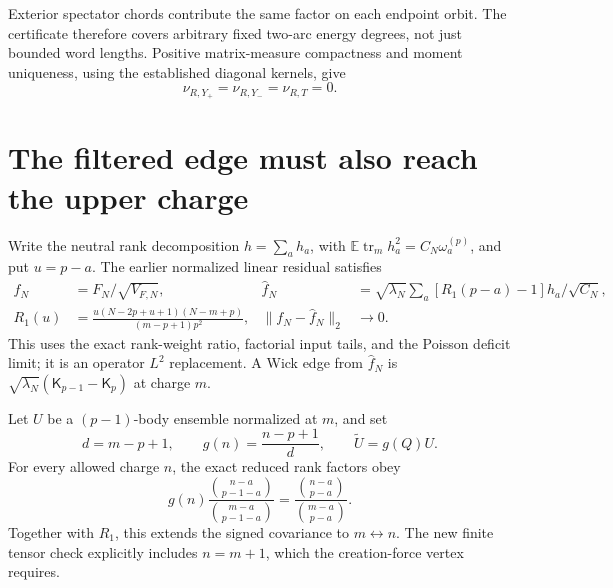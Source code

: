 \documentclass[11pt,a4paper]{article}
\newcommand{\EE}{\mathbb E}
\newcommand{\tr}{\operatorname{tr}}
\begin{document}
Exterior spectator chords contribute the same factor on each
endpoint orbit. The certificate therefore covers arbitrary fixed
two-arc energy degrees, not just bounded word lengths. Positive
matrix-measure compactness and moment uniqueness, using the
established diagonal kernels, give
\begin{equation}
 \boxed{\ \nu_{R,Y_+}=\nu_{R,Y_-}=\nu_{R,T}=0.\ } \label{Rcross}
\end{equation}

\newpage
\section{The filtered edge must also reach the upper charge}
Write the neutral rank decomposition $h=\sum_a h_a$, with
$\EE\tr_m h_a^2=C_N\omega_a^{(p)}$, and put $u=p-a$.
The earlier normalized linear residual satisfies
\begin{align}
 f_N&=F_N/\sqrt{V_{F,N}},&
 \widehat f_N&=\sqrt{\lambda_N}\sum_a[R_1(p-a)-1]h_a/\sqrt{C_N},\\
 R_1(u)&=\frac{u(N-2p+u+1)(N-m+p)}{(m-p+1)p^2},&
 \|f_N-\widehat f_N\|_2&\longrightarrow0. \label{fbridge}
\end{align}
This uses the exact rank-weight ratio, factorial input tails, and
the Poisson deficit limit; it is an operator $L^2$ replacement.
A Wick edge from $\widehat f_N$ is
$\sqrt{\lambda_N}(\mathsf K_{p-1}-\mathsf K_p)$ at charge $m$.

Let $U$ be a $(p-1)$-body ensemble normalized at $m$, and set
\begin{equation}
 d=m-p+1,\qquad g(n)=\frac{n-p+1}{d},\qquad \widetilde U=g(Q)U.
\end{equation}
For every allowed charge $n$, the exact reduced rank factors obey
\begin{equation}
 g(n)\frac{\binom{n-a}{p-1-a}}{\binom{m-a}{p-1-a}}
 =\frac{\binom{n-a}{p-a}}{\binom{m-a}{p-a}}.
\end{equation}
Together with $R_1$, this extends the signed covariance to
$m\leftrightarrow n$. The new finite tensor check explicitly
includes $n=m+1$, which the creation-force vertex requires.
\end{document}
